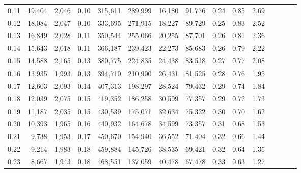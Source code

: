 \begin{tabular}{rrrcrrrrrrrrrrr}
0.11 &  19,404 &  2,046 &                                       0.10 &  315,611 &  289,999 &   16,180 &   91,776 &  0.24 &  0.85 &                         2.69 \\
0.12 &  18,084 &  2,047 &                                       0.10 &  333,695 &  271,915 &   18,227 &   89,729 &  0.25 &  0.83 &                         2.52 \\
0.13 &  16,849 &  2,028 &                                       0.11 &  350,544 &  255,066 &   20,255 &   87,701 &  0.26 &  0.81 &                         2.36 \\
0.14 &  15,643 &  2,018 &                                       0.11 &  366,187 &  239,423 &   22,273 &   85,683 &  0.26 &  0.79 &                         2.22 \\
0.15 &  14,588 &  2,165 &                                       0.13 &  380,775 &  224,835 &   24,438 &   83,518 &  0.27 &  0.77 &                         2.08 \\
0.16 &  13,935 &  1,993 &                                       0.13 &  394,710 &  210,900 &   26,431 &   81,525 &  0.28 &  0.76 &                         1.95 \\
0.17 &  12,603 &  2,093 &                                       0.14 &  407,313 &  198,297 &   28,524 &   79,432 &  0.29 &  0.74 &                         1.84 \\
0.18 &  12,039 &  2,075 &                                       0.15 &  419,352 &  186,258 &   30,599 &   77,357 &  0.29 &  0.72 &                         1.73 \\
0.19 &  11,187 &  2,035 &                                       0.15 &  430,539 &  175,071 &   32,634 &   75,322 &  0.30 &  0.70 &                         1.62 \\
0.20 &  10,393 &  1,965 &                                       0.16 &  440,932 &  164,678 &   34,599 &   73,357 &  0.31 &  0.68 &                         1.53 \\
0.21 &   9,738 &  1,953 &                                       0.17 &  450,670 &  154,940 &   36,552 &   71,404 &  0.32 &  0.66 &                         1.44 \\
0.22 &   9,214 &  1,983 &                                       0.18 &  459,884 &  145,726 &   38,535 &   69,421 &  0.32 &  0.64 &                         1.35 \\
0.23 &   8,667 &  1,943 &                                       0.18 &  468,551 &  137,059 &   40,478 &   67,478 &  0.33 &  0.63 &                         1.27 \\

\end{tabular}
